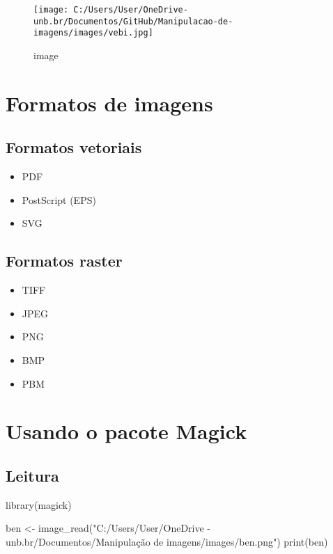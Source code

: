 \documentclass[
]{article}
\newenvironment{Shaded}{\begin{snugshade}}{\end{snugshade}}
\newcommand{\FunctionTok}[1]{\textcolor[rgb]{0.00,0.00,0.00}{#1}}
\newcommand{\NormalTok}[1]{#1}
\newcommand{\OtherTok}[1]{\textcolor[rgb]{0.56,0.35,0.01}{#1}}
\newcommand{\StringTok}[1]{\textcolor[rgb]{0.31,0.60,0.02}{#1}}
\providecommand{\tightlist}{%
  \setlength{\itemsep}{0pt}\setlength{\parskip}{0pt}}
\begin{document}
\begin{figure}
\centering
\texttt{[image: C:/Users/User/OneDrive-unb.br/Documentos/GitHub/Manipulacao-de-imagens/images/vebi.jpg]}
\caption{image}
\end{figure}

\hypertarget{formatos-de-imagens}{%
\section{Formatos de imagens}\label{formatos-de-imagens}}

\hypertarget{formatos-vetoriais}{%
\subsection{Formatos vetoriais}\label{formatos-vetoriais}}

\begin{itemize}
\tightlist
\item
  PDF
\item
  PostScript (EPS)
\item
  SVG
\end{itemize}

\hypertarget{formatos-raster}{%
\subsection{Formatos raster}\label{formatos-raster}}

\begin{itemize}
\tightlist
\item
  TIFF
\item
  JPEG
\item
  PNG
\item
  BMP
\item
  PBM
\end{itemize}

\hypertarget{usando-o-pacote-magick}{%
\section{Usando o pacote Magick}\label{usando-o-pacote-magick}}

\hypertarget{leitura}{%
\subsection{Leitura}\label{leitura}}

\begin{Shaded}
\begin{Highlighting}[]
\FunctionTok{library}\NormalTok{(magick)}

\NormalTok{ben }\OtherTok{\textless{}{-}} \FunctionTok{image\_read}\NormalTok{(}\StringTok{"C:/Users/User/OneDrive {-} unb.br/Documentos/Manipulação de imagens/images/ben.png"}\NormalTok{)}
\FunctionTok{print}\NormalTok{(ben)}
\end{Highlighting}
\end{Shaded}
\end{document}
